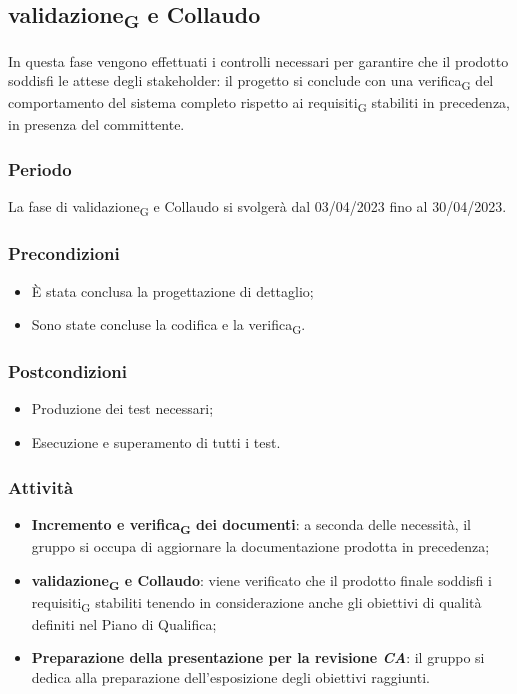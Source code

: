 \subsection{validazione\textsubscript{G} e Collaudo}
In questa fase vengono effettuati i controlli necessari per garantire che il prodotto soddisfi le attese degli stakeholder: il progetto si conclude con una verifica\textsubscript{G} del comportamento del sistema completo rispetto ai requisiti\textsubscript{G} stabiliti in precedenza, in presenza del committente.

\subsubsection{Periodo}
La fase di validazione\textsubscript{G} e Collaudo si svolgerà dal 03/04/2023 fino al 30/04/2023.

\subsubsection{Precondizioni}\:
\begin{itemize}
    \item È stata conclusa la progettazione di dettaglio;
    \item Sono state concluse la codifica e la verifica\textsubscript{G}.
\end{itemize}

\subsubsection{Postcondizioni}\:
\begin{itemize}
    \item Produzione dei test necessari;
    \item Esecuzione e superamento di tutti i test.
\end{itemize}

\subsubsection{Attività}\:
\begin{itemize}
    \item \textbf{Incremento e verifica\textsubscript{G} dei documenti}: a seconda delle necessità, il gruppo si occupa di aggiornare la documentazione prodotta in precedenza;
    \item \textbf{validazione\textsubscript{G} e Collaudo}: viene verificato che il prodotto finale soddisfi i requisiti\textsubscript{G} stabiliti tenendo in considerazione anche gli obiettivi di qualità definiti nel Piano di Qualifica;
    \item \textbf{Preparazione della presentazione per la revisione \textit{CA}}: il gruppo si dedica alla preparazione dell’esposizione degli obiettivi raggiunti.
\end{itemize}

